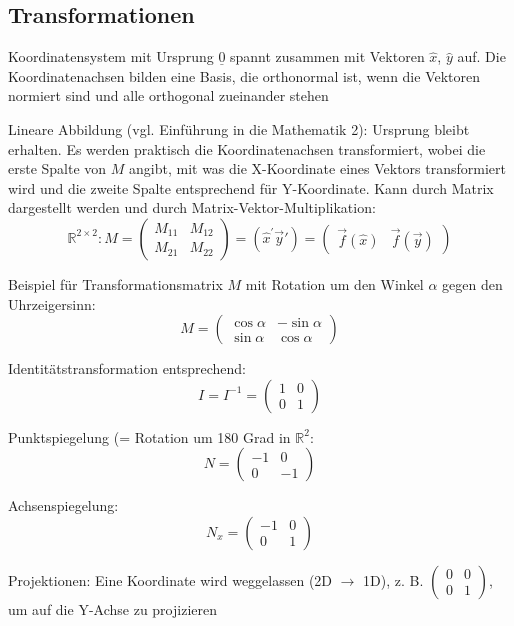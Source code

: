 \documentclass[12pt,landscape]{article}
\begin{document}
\begin{multicols}{3}
\section{Transformationen}
\begin{compactitem}
\item Koordinatensystem mit Ursprung $\underline{0}$ spannt zusammen mit Vektoren $\hat{x}$, $\hat{y}$ auf. Die Koordinatenachsen bilden eine Basis, die orthonormal ist, wenn die Vektoren normiert sind und alle orthogonal zueinander stehen
\item Lineare Abbildung (vgl. Einführung in die Mathematik 2): Ursprung bleibt erhalten. Es werden praktisch die Koordinatenachsen transformiert, wobei die erste Spalte von $M$ angibt, mit was die X-Koordinate eines Vektors transformiert wird und die zweite Spalte entsprechend für Y-Koordinate. Kann durch Matrix dargestellt werden und durch Matrix-Vektor-Multiplikation:
\[
\mathbb{R}^{2 \times 2}: M = \begin{pmatrix}M_{11} & M_{12} \\
M_{21} & M_{22}\end{pmatrix} = (\hat{x}^{'} \vec{y}') = \begin{pmatrix}\vec{f}(\hat{x}) & \vec{f}(\vec{y})\end{pmatrix}
\]
\item Beispiel für Transformationsmatrix $M$ mit Rotation um den Winkel $\alpha$ gegen den Uhrzeigersinn: 
\[
M = \begin{pmatrix}
\cos \alpha & -\sin \alpha \\
\sin \alpha & \cos \alpha
\end{pmatrix}
\]
\item Identitätstransformation entsprechend:
\[
I = I^{-1} = \begin{pmatrix}
1 & 0 \\ 0 & 1
\end{pmatrix}
\]
\item Punktspiegelung (= Rotation um 180 Grad in $\mathbb{R}^2$:
\[
N = \begin{pmatrix}
-1 & 0 \\ 0 & -1
\end{pmatrix}
\]
\item Achsenspiegelung:
\[
N_x = \begin{pmatrix}
-1 & 0 \\ 0 & 1
\end{pmatrix}
\]
\item Projektionen: Eine Koordinate wird weggelassen (2D $\rightarrow$ 1D), z. B. $\begin{pmatrix} 0 & 0 \\ 0 & 1\end{pmatrix}$, um auf die Y-Achse zu projizieren

\end{compactitem}
\end{multicols}
\end{document}
